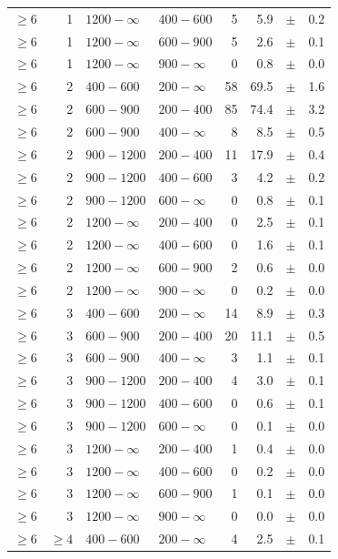 \begin{table}[!h]
\begin{tabular}{rrllrrcl}
$\geq 6$ & 1 & $1200- \infty$ & $400-600$ &      5 &      5.9 &$\pm$&    0.2 \\
$\geq 6$ & 1 & $1200- \infty$ & $600-900$ &      5 &      2.6 &$\pm$&    0.1 \\
$\geq 6$ & 1 & $1200- \infty$ & $900-\infty$ &      0 &      0.8 &$\pm$&    0.0 \\
$\geq 6$\T & 2 & $ 400- 600$ & $200-\infty$ &     58 &     69.5 &$\pm$&    1.6 \\
$\geq 6$\T & 2 & $ 600- 900$ & $200-400$ &     85 &     74.4 &$\pm$&    3.2 \\
$\geq 6$ & 2 & $ 600- 900$ & $400-\infty$ &      8 &      8.5 &$\pm$&    0.5 \\
$\geq 6$\T & 2 & $ 900-1200$ & $200-400$ &     11 &     17.9 &$\pm$&    0.4 \\
$\geq 6$ & 2 & $ 900-1200$ & $400-600$ &      3 &      4.2 &$\pm$&    0.2 \\
$\geq 6$ & 2 & $ 900-1200$ & $600-\infty$ &      0 &      0.8 &$\pm$&    0.1 \\
$\geq 6$\T & 2 & $1200- \infty$ & $200-400$ &      0 &      2.5 &$\pm$&    0.1 \\
$\geq 6$ & 2 & $1200- \infty$ & $400-600$ &      0 &      1.6 &$\pm$&    0.1 \\
$\geq 6$ & 2 & $1200- \infty$ & $600-900$ &      2 &      0.6 &$\pm$&    0.0 \\
$\geq 6$ & 2 & $1200- \infty$ & $900-\infty$ &      0 &      0.2 &$\pm$&    0.0 \\
$\geq 6$\T & 3 & $ 400- 600$ & $200-\infty$ &     14 &      8.9 &$\pm$&    0.3 \\
$\geq 6$\T & 3 & $ 600- 900$ & $200-400$ &     20 &     11.1 &$\pm$&    0.5 \\
$\geq 6$ & 3 & $ 600- 900$ & $400-\infty$ &      3 &      1.1 &$\pm$&    0.1 \\
$\geq 6$\T & 3 & $ 900-1200$ & $200-400$ &      4 &      3.0 &$\pm$&    0.1 \\
$\geq 6$ & 3 & $ 900-1200$ & $400-600$ &      0 &      0.6 &$\pm$&    0.1 \\
$\geq 6$ & 3 & $ 900-1200$ & $600-\infty$ &      0 &      0.1 &$\pm$&    0.0 \\
$\geq 6$\T & 3 & $1200- \infty$ & $200-400$ &      1 &      0.4 &$\pm$&    0.0 \\
$\geq 6$ & 3 & $1200- \infty$ & $400-600$ &      0 &      0.2 &$\pm$&    0.0 \\
$\geq 6$ & 3 & $1200- \infty$ & $600-900$ &      1 &      0.1 &$\pm$&    0.0 \\
$\geq 6$ & 3 & $1200- \infty$ & $900-\infty$ &      0 &      0.0 &$\pm$&    0.0 \\
$\geq 6$\T & $\geq 4$ & $ 400- 600$ & $200-\infty$ &      4 &      2.5 &$\pm$&    0.1 \\
    \hline
  \end{tabular}
\end{table}

